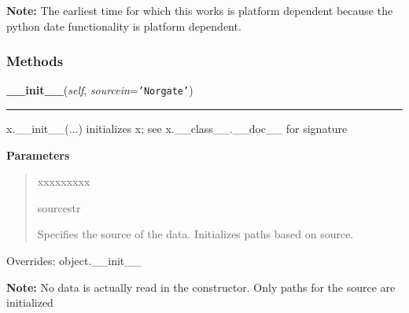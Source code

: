 \textbf{Note:} The earliest time for which this works is platform dependent because the 
python date functionality is platform dependent.





  \subsubsection{Methods}

    \vspace{0.5ex}

\hspace{.8\funcindent}\begin{boxedminipage}{\funcwidth}

    \raggedright \textbf{\_\_init\_\_}(\textit{self}, \textit{sourcein}={\tt \texttt{'}\texttt{Norgate}\texttt{'}})

    \vspace{-1.5ex}

    \rule{\textwidth}{0.5\fboxrule}
\setlength{\parskip}{2ex}
    x.\_\_init\_\_(...) initializes x; see x.\_\_class\_\_.\_\_doc\_\_ for 
    signature

\setlength{\parskip}{1ex}
      \textbf{Parameters}
      \vspace{-1ex}

      \begin{quote}
        \begin{Ventry}{xxxxxxxxx}

          \item[sourcestr]

          Specifies the source of the data. Initializes paths based on 
          source.

        \end{Ventry}

      \end{quote}

      Overrides: object.\_\_init\_\_

\textbf{Note:} No data is actually read in the constructor. Only paths for the source are 
initialized



    \end{boxedminipage}

    \label{trunk:qstkutil:DataAccess:DataAccess:get_data_hardread}

